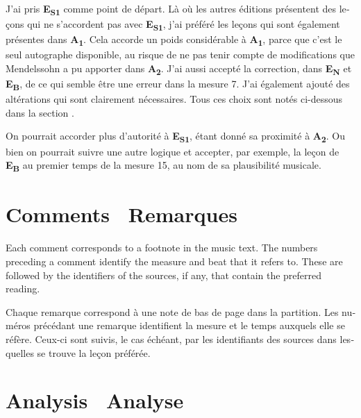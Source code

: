 \documentclass[a4paper, 12pt]{book}
\newcommand{\source}[2]{\textbf{#1\textsubscript{#2}}}
\newcommand{\bigdot}[0]{{\Large \textbullet}}
\newcommand{\centerbigdot}[0]{\begin{center}\bigdot\end{center}}
\begin{document}
{\begin{otherlanguage}{french}
    J'ai pris \source{E}{S1} comme point de départ. Là où les autres
    éditions présentent des leçons qui ne s'accordent pas avec
    \source{E}{S1}, j'ai préféré les leçons qui sont également
    présentes dans \source{A}{1}. Cela accorde un poids considérable à
    \source{A}{1}, parce que c'est le seul autographe disponible, au
    risque de ne pas tenir compte de modifications que Mendelssohn a
    pu apporter dans \source{A}{2}.  J'ai aussi accepté la correction,
    dans \source{E}{N} et \source{E}{B}, de ce qui semble être une
    erreur dans la mesure 7. J'ai également ajouté des altérations qui
    sont clairement nécessaires. Tous ces choix sont notés ci-dessous
    dans la section .

    On pourrait accorder plus d'autorité à \source{E}{S1}, étant donné
    sa proximité à \source{A}{2}. Ou bien on pourrait suivre une autre
    logique et accepter, par exemple, la leçon de \source{E}{B} au
    premier temps de la mesure 15, au nom de sa plausibilité musicale.
    \end{otherlanguage}
    
    \section*{Comments \bigdot\ \foreignlanguage{french}{Remarques}}
    \label{sec:comments}

    Each comment corresponds to a footnote in the music text. The
    numbers preceding a comment identify the measure and beat that
    it refers to. These are followed by the identifiers of the
    sources, if any, that contain the preferred reading.
    
    \centerbigdot

    \begin{otherlanguage}{french}
      Chaque remarque correspond à une note de bas de page dans la
      partition. Les numéros précédant une remarque identifient la
      mesure et le temps auxquels elle se réfère. Ceux-ci sont suivis,
      le cas échéant, par les identifiants des sources dans lesquelles
      se trouve la leçon préférée.
    \end{otherlanguage}

    

    \section*{Analysis \bigdot\ \foreignlanguage{french}{Analyse}}
    \label{sec:analysis}

}
\end{document}

